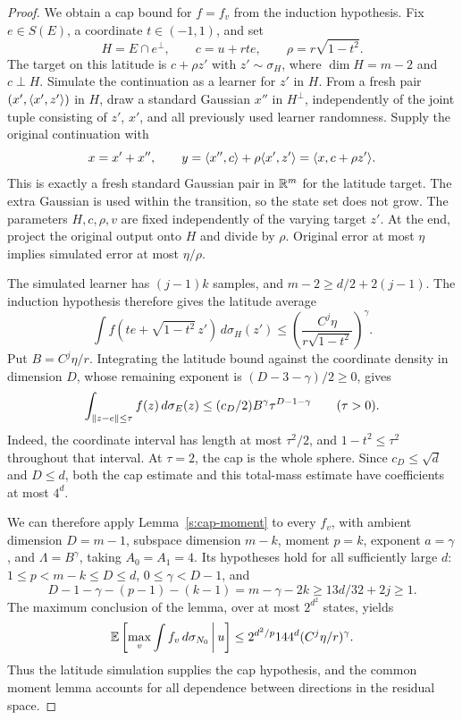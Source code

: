 \begin{proof}
We obtain a cap bound for \(f=f_v\) from the induction hypothesis.
Fix \(e\in S(E)\), a coordinate \(t\in(-1,1)\), and set
\[
 H=E\cap e^\perp,\qquad
 c=u+rt e,\qquad \rho=r\sqrt{1-t^2}.
\]
The target on this latitude is \(c+\rho z'\) with
\(z'\sim\sigma_H\), where \(\dim H=m-2\) and \(c\perp H\).
Simulate the continuation as a learner for \(z'\) in \(H\).
From a fresh pair \((x',\langle x',z'\rangle)\) in \(H\), draw a standard
Gaussian \(x''\) in \(H^\perp\), independently of the joint tuple
consisting of \(z'\), \(x'\), and all previously used learner
randomness. Supply the original
continuation with
\begin{equation}\label{s:latitude-simulation}
 x=x'+x'',\qquad
 y=\langle x'',c\rangle+\rho\langle x',z'\rangle=\langle x,c+\rho z'\rangle.
\end{equation}
This is exactly a fresh standard Gaussian pair in \(\mathbb R^m\) for the
latitude target. The extra Gaussian is used within the transition,
so the state set does not grow. The parameters \(H,c,\rho,v\) are
fixed independently of the varying target \(z'\). At the end, project
the original output onto \(H\) and divide by \(\rho\).
Original error at most \(\eta\) implies simulated error at most
\(\eta/\rho\).

The simulated learner has \((j-1)k\) samples, and
\(m-2\ge d/2+2(j-1)\). The induction hypothesis therefore gives the
latitude average
\[
 \int f(t e+\sqrt{1-t^2}\,z')\,d\sigma_H(z')
 \le\left(\frac{C^j\eta}{r\sqrt{1-t^2}}\right)^\gamma.
\]
Put \(B=C^j\eta/r\). Integrating the latitude bound against the
coordinate density in dimension \(D\), whose remaining exponent is
\((D-3-\gamma)/2\ge0\), gives
\begin{equation}\label{s:fixed-cap}
 \int_{\left\lVert z-e\right\rVert\le\tau}f(z)\,d\sigma_E(z)
 \le(c_D/2)B^\gamma\tau^{D-1-\gamma}
 \qquad(\tau>0).
\end{equation}
Indeed, the coordinate interval has length at most \(\tau^2/2\), and
\(1-t^2\le\tau^2\) throughout that interval. At \(\tau=2\), the cap
is the whole sphere. Since \(c_D\le\sqrt d\) and \(D\le d\), both
the cap estimate and this total-mass estimate have coefficients at
most \(4^d\).

We can therefore apply Lemma~\ref{s:cap-moment} to every \(f_v\),
with ambient dimension \(D=m-1\), subspace dimension \(m-k\),
moment \(p=k\), exponent \(a=\gamma\), and
\(\Lambda=B^\gamma\), taking \(A_0=A_1=4\). Its hypotheses hold
for all sufficiently large \(d\):
\(1\le p<m-k\le D\le d\), \(0\le\gamma<D-1\), and
\[
 D-1-\gamma-(p-1)-(k-1)
 =m-\gamma-2k\ge13d/32+2j\ge1.
\]
The maximum conclusion of the lemma, over at most \(2^{d^2}\)
states, yields
\begin{equation}\label{s:fixed-moment}
 \mathbb E\left[\max_v\int f_v\,d\sigma_{N_0}\,\middle|\,u\right]
 \le2^{d^2/p}144^d(C^j\eta/r)^\gamma.
\end{equation}
Thus the latitude simulation supplies the cap hypothesis, and the
common moment lemma accounts for all dependence between directions
in the residual space.


\end{proof}
